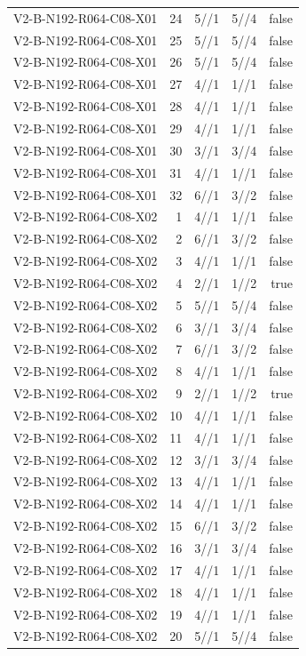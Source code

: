 {\begin{longtable}{lrrrr}
V2-B-N192-R064-C08-X01 & 24 & 5//1 & 5//4 & false \\
V2-B-N192-R064-C08-X01 & 25 & 5//1 & 5//4 & false \\
V2-B-N192-R064-C08-X01 & 26 & 5//1 & 5//4 & false \\
V2-B-N192-R064-C08-X01 & 27 & 4//1 & 1//1 & false \\
V2-B-N192-R064-C08-X01 & 28 & 4//1 & 1//1 & false \\
V2-B-N192-R064-C08-X01 & 29 & 4//1 & 1//1 & false \\
V2-B-N192-R064-C08-X01 & 30 & 3//1 & 3//4 & false \\
V2-B-N192-R064-C08-X01 & 31 & 4//1 & 1//1 & false \\
V2-B-N192-R064-C08-X01 & 32 & 6//1 & 3//2 & false \\
V2-B-N192-R064-C08-X02 & 1 & 4//1 & 1//1 & false \\
V2-B-N192-R064-C08-X02 & 2 & 6//1 & 3//2 & false \\
V2-B-N192-R064-C08-X02 & 3 & 4//1 & 1//1 & false \\
V2-B-N192-R064-C08-X02 & 4 & 2//1 & 1//2 & true \\
V2-B-N192-R064-C08-X02 & 5 & 5//1 & 5//4 & false \\
V2-B-N192-R064-C08-X02 & 6 & 3//1 & 3//4 & false \\
V2-B-N192-R064-C08-X02 & 7 & 6//1 & 3//2 & false \\
V2-B-N192-R064-C08-X02 & 8 & 4//1 & 1//1 & false \\
V2-B-N192-R064-C08-X02 & 9 & 2//1 & 1//2 & true \\
V2-B-N192-R064-C08-X02 & 10 & 4//1 & 1//1 & false \\
V2-B-N192-R064-C08-X02 & 11 & 4//1 & 1//1 & false \\
V2-B-N192-R064-C08-X02 & 12 & 3//1 & 3//4 & false \\
V2-B-N192-R064-C08-X02 & 13 & 4//1 & 1//1 & false \\
V2-B-N192-R064-C08-X02 & 14 & 4//1 & 1//1 & false \\
V2-B-N192-R064-C08-X02 & 15 & 6//1 & 3//2 & false \\
V2-B-N192-R064-C08-X02 & 16 & 3//1 & 3//4 & false \\
V2-B-N192-R064-C08-X02 & 17 & 4//1 & 1//1 & false \\
V2-B-N192-R064-C08-X02 & 18 & 4//1 & 1//1 & false \\
V2-B-N192-R064-C08-X02 & 19 & 4//1 & 1//1 & false \\
V2-B-N192-R064-C08-X02 & 20 & 5//1 & 5//4 & false \\

\end{longtable}}
